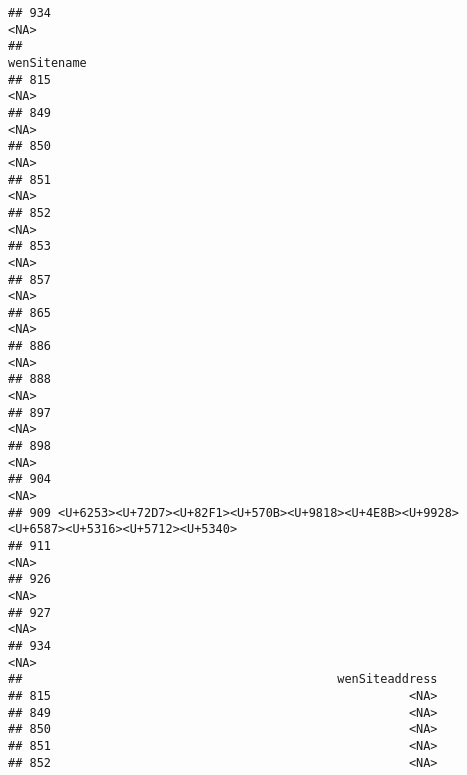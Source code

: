 \documentclass[
]{article}
\begin{document}
\begin{verbatim}
## 934                                                                                                                                                                                                                                                                                                                                                                                                                                     <NA>
##                                                                                  wenSitename
## 815                                                                                     <NA>
## 849                                                                                     <NA>
## 850                                                                                     <NA>
## 851                                                                                     <NA>
## 852                                                                                     <NA>
## 853                                                                                     <NA>
## 857                                                                                     <NA>
## 865                                                                                     <NA>
## 886                                                                                     <NA>
## 888                                                                                     <NA>
## 897                                                                                     <NA>
## 898                                                                                     <NA>
## 904                                                                                     <NA>
## 909 <U+6253><U+72D7><U+82F1><U+570B><U+9818><U+4E8B><U+9928><U+6587><U+5316><U+5712><U+5340>
## 911                                                                                     <NA>
## 926                                                                                     <NA>
## 927                                                                                     <NA>
## 934                                                                                     <NA>
##                                            wenSiteaddress
## 815                                                  <NA>
## 849                                                  <NA>
## 850                                                  <NA>
## 851                                                  <NA>
## 852                                                  <NA>

\end{verbatim}
\end{document}
